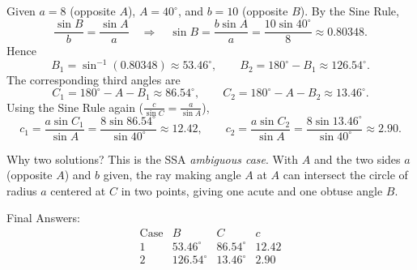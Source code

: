\documentclass[11pt]{article}
\def\textbf#1{#1}%
\begin{document}
\begin{solution}
Given \(a=8\) (opposite \(A\)), \(A=40^\circ\), and \(b=10\) (opposite \(B\)).
By the Sine Rule,
\[
\frac{\sin B}{b}=\frac{\sin A}{a}
\quad\Longrightarrow\quad
\sin B=\frac{b\sin A}{a}
=\frac{10\sin 40^\circ}{8}\approx 0.80348.
\]
Hence
\[
B_1=\sin^{-1}(0.80348)\approx 53.46^\circ,
\qquad
B_2=180^\circ-B_1\approx 126.54^\circ.
\]
The corresponding third angles are
\[
C_1=180^\circ-A-B_1\approx 86.54^\circ,
\qquad
C_2=180^\circ-A-B_2\approx 13.46^\circ.
\]
Using the Sine Rule again (\( \tfrac{c}{\sin C}=\tfrac{a}{\sin A}\)),
\[
c_1=\frac{a\sin C_1}{\sin A}
=\frac{8\sin 86.54^\circ}{\sin 40^\circ}\approx 12.42,
\qquad
c_2=\frac{a\sin C_2}{\sin A}
=\frac{8\sin 13.46^\circ}{\sin 40^\circ}\approx 2.90.
\]

\textbf{Why two solutions?}  
This is the SSA \emph{ambiguous case}.  With \(A\) and the two sides \(a\) (opposite \(A\)) and \(b\) given, the ray making angle \(A\) at \(A\) can intersect the circle of radius \(a\) centered at \(C\) in two points, giving one acute and one obtuse angle \(B\).

\begin{center}
\end{center}

\textbf{Final Answers:}
\[
\begin{array}{c|c|c|c}
\text{Case} & B & C & c \\ \hline
1 & 53.46^\circ & 86.54^\circ & 12.42 \\
2 & 126.54^\circ & 13.46^\circ & 2.90
\end{array}
\]
\end{solution}
\end{document}
